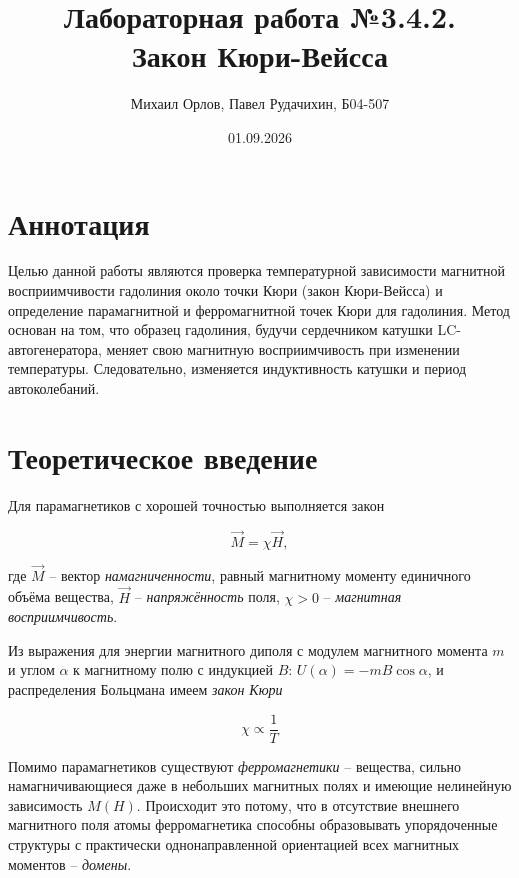\documentclass{article}
\title{Лабораторная работа №3.4.2. \\ \textbf{Закон Кюри-Вейсса}}
\author{Михаил Орлов, Павел Рудачихин, Б04-507}
\date{01.09.2026}
\begin{document}
\maketitle{}


\section {Аннотация} 
	\hspace{4mm} Целью данной работы являются проверка температурной зависимости магнитной восприимчивости гадолиния около точки Кюри (закон Кюри-Вейсса) и определение парамагнитной и ферромагнитной точек Кюри для гадолиния. Метод основан на том, что образец гадолиния, будучи сердечником катушки LC-автогенератора, меняет свою магнитную восприимчивость  при изменении температуры. Следовательно, изменяется индуктивность катушки и период автоколебаний.

\section {Теоретическое введение}

	\hspace{4mm} Для парамагнетиков с хорошей точностью выполняется закон
	
	\begin{equation}
		\vec{M} = \chi \vec{H},
	\end{equation}
	
	где $\vec{M}$ -- вектор \textit{намагниченности}, равный магнитному моменту единичного объёма вещества, $\vec{H}$ -- \textit{напряжённость} поля, $\chi > 0$ -- \textit{магнитная восприимчивость}. 
	
	
	Из выражения для энергии магнитного диполя с модулем магнитного момента $m$ и углом $\alpha$ к магнитному полю с индукцией $B$: $U(\alpha) = -mB\cos\alpha$, и распределения Больцмана имеем \textit{закон Кюри}
	
	\begin{equation}
		\chi \propto \frac{1}{T}
	\end{equation}
	
	
	Помимо парамагнетиков существуют \textit{ферромагнетики} -- вещества, сильно намагничивающиеся даже в небольших магнитных полях и имеющие нелинейную зависимость $M(H)$. Происходит это потому, что в отсутствие внешнего магнитного поля атомы ферромагнетика способны образовывать упорядоченные структуры с практически однонаправленной ориентацией всех магнитных моментов -- \textit{домены}. 
	
\end{document}
